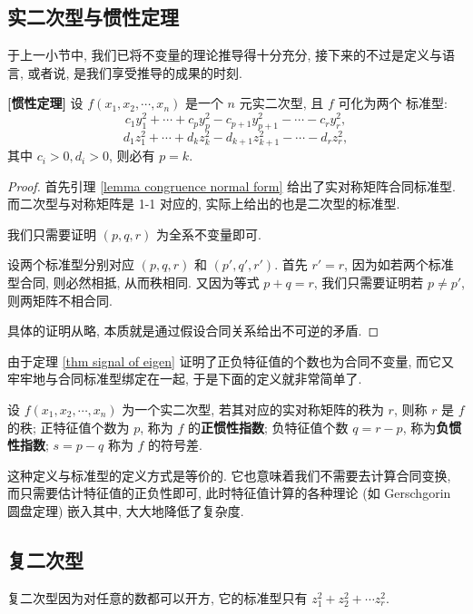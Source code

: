 \documentclass[UTF8]{book}
\begin{document}
\subsection{实二次型与惯性定理}
于上一小节中, 我们已将不变量的理论推导得十分充分, 接下来的不过是定义与语言, 
或者说, 是我们享受推导的成果的时刻. 

\begin{theorem}
    \textbf{[惯性定理]} 
    设 $f(x_1,x_2,\cdots,x_n)$ 是一个 $n$ 元实二次型, 且 $f$ 可化为两个
    标准型: 
    $$ c_1y_1^2 +\cdots +c_py_p^2 - c_{p+1}y_{p+1}^2 - \cdots - c_ry_r^2,$$
    $$ d_1z_1^2 +\cdots +d_kz_k^2 - d_{k+1}z_{k+1}^2 - \cdots - d_rz_r^2,$$
    其中 $c_i>0,d_i>0$, 则必有 $p=k$. 
\end{theorem}

\begin{proof}
    首先引理 \ref{lemma congruence normal form} 给出了实对称矩阵合同标准型. 
    而二次型与对称矩阵是 1-1 对应的, 实际上给出的也是二次型的标准型.

    我们只需要证明 $(p,q,r)$ 为全系不变量即可. 

    设两个标准型分别对应 $(p,q,r)$ 和 $(p',q',r')$. 
    首先 $r'=r$, 因为如若两个标准型合同, 则必然相抵, 从而秩相同. 
    又因为等式 $p+q = r$, 我们只需要证明若 $p\neq p'$, 则两矩阵不相合同. 

    具体的证明从略, 本质就是通过假设合同关系给出不可逆的矛盾. 
\end{proof}

由于定理 \ref{thm signal of eigen} 证明了正负特征值的个数也为合同不变量, 
而它又牢牢地与合同标准型绑定在一起, 于是下面的定义就非常简单了. 

\begin{definition}
    设 $f(x_1,x_2,\cdots,x_n)$ 为一个实二次型, 
    若其对应的实对称矩阵的秩为 $r$, 则称 $r$ 是 $f$ 的秩; 
    正特征值个数为 $p$, 
    称为 $f$ 的\textbf{正惯性指数}; 
    负特征值个数 $q=r-p$, 称为\textbf{负惯性指数}; 
    $s = p-q$ 称为 $f$ 的符号差.
\end{definition}

这种定义与标准型的定义方式是等价的. 它也意味着我们不需要去计算合同变换, 
而只需要估计特征值的正负性即可, 此时特征值计算的各种理论 
(如 Gerschgorin 圆盘定理) 嵌入其中, 大大地降低了复杂度. 

\subsection{复二次型}
复二次型因为对任意的数都可以开方, 
它的标准型只有 $z_1^2+z_2^2+\cdots z_r^2$. 
\end{document}
